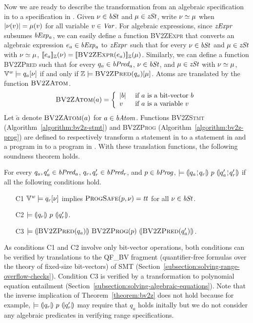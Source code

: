 Now we are ready to describe the transformation from an algebraic specification in \bvdsl to a specification in \zdsl.
Given $\nu \in \mathit{bSt}$ and $\mu \in \mathit{zSt}$, write $\nu \simeq \mu$ when $|\nu(v)| = \mu(v)$ for all variable $v \in \mathit{Var}$.
For algebraic expressions, since $\mathit{zExpr}$ subsumes $\mathit{bExp_a}$, we can easily define a function \textsc{BV2ZExpr} that converts an algebraic expression $e_a \in \mathit{bExp_a}$ to $\mathit{zExpr}$ such that for every $\nu \in \mathit{bSt}$ and $\mu \in \mathit{zSt}$ with $\nu \simeq \mu$, $[\![{e_a}]\!]_{\mathbb{Z}}(\nu) = [\![{\textsc{BV2ZExpr}(e_a)}]\!]_{\mathbb{Z}}(\mu)$.
Similarly, we can define a function \textsc{BV2ZPred} such that for every $q_a \in \mathit{bPred_a}$, $\nu \in \mathit{bSt}$, and $\mu \in \mathit{zSt}$ with $\nu \simeq \mu$, $\mathbb{V}^{\mathit{w}} \models q_a[\nu]$ if and only if $\mathbb{Z} \models \textsc{BV2ZPred}(q_a)[\mu]$.
Atoms are translated by the function $\textsc{BV2ZAtom}$.
\[
\textsc{BV2ZAtom}(a) = \left\{
  \begin{array}{ll}
  |b| & \textmd{ if $a$ is a bit-vector $b$} \\
  v   & \textmd{ if $a$ is a variable $v$}
  \end{array} \right.
\]
Let $\tilde{a}$ denote $\textsc{BV2ZAtom}(a)$ for $a \in \mathit{bAtom}$.
Functions \textsc{BV2ZStmt} (Algorithm~\ref{algorithm:bv2z-stmt}) and \textsc{BV2ZProg} (Algorithm~\ref{algorithm:bv2z-prog}) are defined to respectively transform a statement in \bvdsl to a statement in \zdsl and a program in \bvdsl to a program in \zdsl.
With these translation functions, the following soundness theorem holds.
\begin{theorem}
  For every $q_a, q_a' \in \mathit{bPred_a}$, $q_r, q_r' \in \mathit{bPred_r}$, and $p \in \mathit{bProg}$, $\models \hoaretriple{q_a \andar q_r}{p}{q_a' \andar q_r'}$ if all the following conditions hold.
  \begin{itemize}
  \item[C1] $\mathbb{V}^{\mathit{w}} \models q_r[\nu]$ implies $\textsc{ProgSafe}(p, \nu) = \mathit{tt}$ for all $\nu \in \mathit{bSt}$.
  \item[C2] $\models {(\!|}{q_r}{|\!)}~{p}~{(\!|}{q_r'}{|\!)}$.
  \item[C3] $\models {(\!|}{\textsc{BV2ZPred}(q_a)}{|\!)}~{\textsc{BV2ZProg}(p)}~{(\!|}{\textsc{BV2ZPred}(q_a')}{|\!)}$.
  \end{itemize}
  \label{theorem:bv2z}
\end{theorem}
As conditions C1 and C2 involve only bit-vector operations, both conditions can be verified by translations to the QF\_BV fragment (quantifier-free formulas over the theory of fixed-size bit-vectors) of SMT (Section~\ref{subsection:solving-range-overflow-checks}).
Condition C3 is verified by a transformation to polynomial equation entailment (Section~\ref{subsection:solving-algebraic-equations}).
Note that the inverse implication of Theorem~\ref{theorem:bv2z} does not hold because for example, $\models {(\!|}{q_r}{|\!)}~{p}~{(\!|}{q_r'}{|\!)}$ may require that $q_a$ holds initally but we do not consider any algebraic predicates in verifying range specifications.

